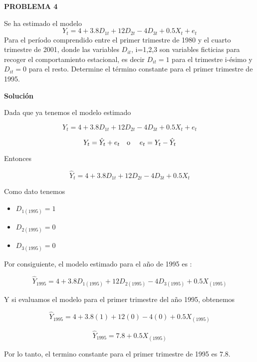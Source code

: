 \documentclass[10pt,a4paper, openany ]{book}
\begin{document}
  \pagecolor{pagecolor}
  \color{verdeclaro}
  \newpage
  \Large
  \newpage
  \begin{center}
        \textbf{PROBLEMA 4}
    \end{center}
    Se ha estimado el modelo 
    \begin{equation*}
        Y_{t} = 4+3.8D_{1t}+12D_{2t}-4D_{3t}+0.5X_{t}+e_{t}
    \end{equation*}
    Para el período comprendido entre el primer trimestre de 1980 y el cuarto trimestre de 2001, donde las variables $D_{it}$, i=1,2,3 son variables ficticias para recoger el comportamiento estacional, es decir $D_{it}=1$ para el trimestre  i-ésimo y $D_{it}=0$ para el resto. Determine el término constante para el primer trimestre de 1995.
    \begin{center}
        \textbf{Solución}
    \end{center}
    
    \noindent Dada que ya tenemos el modelo estimado 

    \begin{equation*}
      Y_{t} = 4+3.8D_{1t}+12D_{2t}-4D_{3t}+0.5X_{t}+e_{t}
    \end{equation*}
    
    \begin{equation*}
      Y_{t} = \hat{Y}_{t} +e_{t}  \, \, \, \, \, \,  \textup{o} \, \, \, \, \, \, \, \,  e_{t} = Y_{t}-\hat{Y}_{t}
    \end{equation*}

    \noindent Entonces 

    \begin{equation*}
      \hat{Y}_{t} = 4+3.8D_{1t}+12D_{2t}-4D_{3t}+0.5X_{t}
    \end{equation*}

    \noindent Como dato tenemos  

    \begin{itemize}
        \item $D_{1(1995)} = 1$
        \item $D_{2(1995)} = 0$
        \item $D_{3(1995)} = 0$
    \end{itemize}


    \noindent Por consiguiente, el modelo estimado para el año de 1995 es :

    \begin{equation*}
      \hat{Y}_{1995} = 4+3.8D_{1(1995)}+12D_{2(1995)}-4D_{3(1995)}+0.5X_{(1995)}
    \end{equation*}
    
    \noindent Y si evaluamos el modelo para el primer trimestre del año 1995, obtenemos

    \begin{equation*}
      \hat{Y}_{1995} = 4 + 3.8(1) + 12(0) - 4(0) + 0.5X_{(1995)}
    \end{equation*}

  
    \begin{equation*}
      \hat{Y}_{1995} = 7.8 + 0.5X_{(1995)}
    \end{equation*}

    \noindent Por lo tanto, el termino constante para el primer trimestre de 1995 es $7.8$.
    
\end{document}
